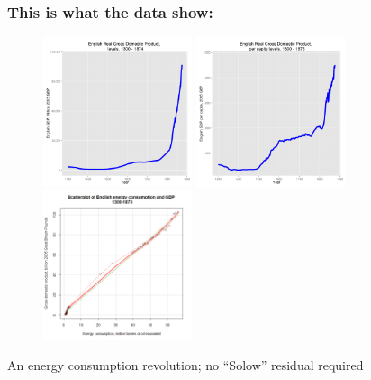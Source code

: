 \documentclass[final]{beamer}
\begin{document}
\begin{frame}
\frametitle{This is what the data show:}
\begin{figure}[p!]
\label{fig:scatterplot}
		\centerline{
		\mbox{\includegraphics[width=0.39\textwidth]{ggdp}}
		\mbox{\includegraphics[width=0.39\textwidth]{ggdppop}}
		\mbox{\includegraphics[width=0.39\textwidth]{scatterplot.png}}
		}
\end{figure} \vspace*{-0.4in}
An energy consumption revolution; no ``Solow'' residual required
\end{frame}
\end{document}
